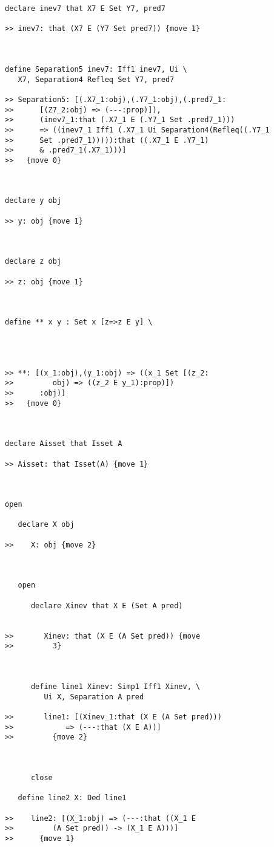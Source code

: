 \documentclass[12pt]{article}
\begin{document}
\begin{verbatim}
declare inev7 that X7 E Set Y7, pred7

>> inev7: that (X7 E (Y7 Set pred7)) {move 1}



define Separation5 inev7: Iff1 inev7, Ui \
   X7, Separation4 Refleq Set Y7, pred7

>> Separation5: [(.X7_1:obj),(.Y7_1:obj),(.pred7_1:
>>      [(Z7_2:obj) => (---:prop)]),
>>      (inev7_1:that (.X7_1 E (.Y7_1 Set .pred7_1)))
>>      => ((inev7_1 Iff1 (.X7_1 Ui Separation4(Refleq((.Y7_1
>>      Set .pred7_1))))):that ((.X7_1 E .Y7_1)
>>      & .pred7_1(.X7_1)))]
>>   {move 0}



declare y obj

>> y: obj {move 1}



declare z obj

>> z: obj {move 1}



define ** x y : Set x [z=>z E y] \
   



>> **: [(x_1:obj),(y_1:obj) => ((x_1 Set [(z_2:
>>         obj) => ((z_2 E y_1):prop)])
>>      :obj)]
>>   {move 0}



declare Aisset that Isset A

>> Aisset: that Isset(A) {move 1}



open

   declare X obj

>>    X: obj {move 2}



   open

      declare Xinev that X E (Set A pred)


>>       Xinev: that (X E (A Set pred)) {move
>>         3}



      define line1 Xinev: Simp1 Iff1 Xinev, \
         Ui X, Separation A pred

>>       line1: [(Xinev_1:that (X E (A Set pred)))
>>            => (---:that (X E A))]
>>         {move 2}



      close

   define line2 X: Ded line1

>>    line2: [(X_1:obj) => (---:that ((X_1 E
>>         (A Set pred)) -> (X_1 E A)))]
>>      {move 1}




\end{verbatim}
\end{document}
